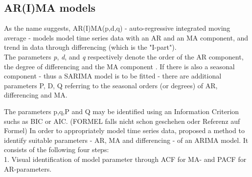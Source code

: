 \documentclass[12pt,titlepage]{article}
\begin{document}
\subsection{AR(I)MA models}

As the name suggests, AR(I)MA(p,d,q) - auto-regressive integrated moving average - models model time series data with an AR and an MA component, and trend in data through differencing (which is the "I-part"). \\
The parameters \textit{p}, \textit{d}, and \textit{q} respectively denote the order of the AR component, the degree of differencing and the MA component \citep{Zhao.07022018}.
If there is also a seasonal component - thus a SARIMA model is to be fitted - there are additional parameters P, D, Q referring to the seasonal orders (or degrees) of AR, differencing and MA.


The parameters p,q,P and Q may be identified using an Information Criterion suchs as BIC or AIC. (FORMEL falls nicht schon geschehen oder Referenz auf Formel)
In order to appropriately model time series data, \citep{Box.1976} proposed a method to identify suitable parameters - AR, MA and differencing - of an ARIMA model. It consists of the following four steps: \\
1. Visual identification of model parameter through ACF for MA- and PACF for AR-parameters.





\end{document}
